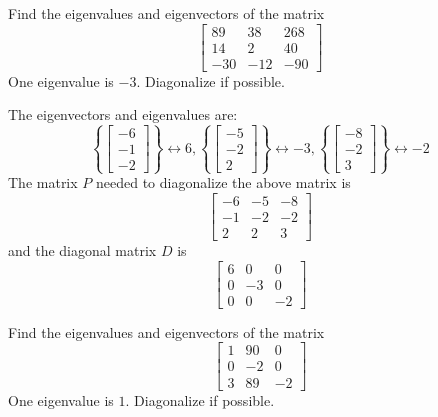 \documentclass{ximera}
\begin{document}
\begin{problem}\label{prb:8.22} Find the eigenvalues and eigenvectors of the matrix
\begin{equation*}
\left[
\begin{array}{rrr}
89 & 38 & 268 \\
14 & 2 & 40 \\
-30 & -12 & -90
\end{array}
\right]
\end{equation*}
One eigenvalue is $-3.$ Diagonalize if possible.
\begin{hint}
The eigenvectors and eigenvalues are:
\[
\left\{ \left[
\begin{array}{c}
-6 \\
-1 \\
-2
\end{array}
\right] \right\} \leftrightarrow 6, \left\{ \left[
\begin{array}{c}
-5 \\
-2 \\
2
\end{array}
\right] \right\} \leftrightarrow -3, \left\{ \left[
\begin{array}{c}
-8 \\
-2 \\
3
\end{array}
\right] \right\} \leftrightarrow -2
\]
The matrix $P$ needed to diagonalize the above matrix is
\[
\left[
\begin{array}{rrr}
-6 & -5 & -8 \\
-1 & -2 & -2 \\
2 & 2 & 3
\end{array}
\right]
\]
and the diagonal matrix $D$ is
\[
\left[
\begin{array}{rrr}
6 & 0 & 0  \\
0 & -3 & 0 \\
0 & 0 & -2
\end{array}
\right]
\]
\end{hint}
\end{problem}

\begin{problem}\label{prb:8.23} Find the eigenvalues and eigenvectors of the matrix
\begin{equation*}
\left[
\begin{array}{rrr}
1 & 90 & 0 \\
0 & -2 & 0 \\
3 & 89 & -2
\end{array}
\right]
\end{equation*}
One eigenvalue is $1.$ Diagonalize if possible.
\end{problem}
\end{document}
